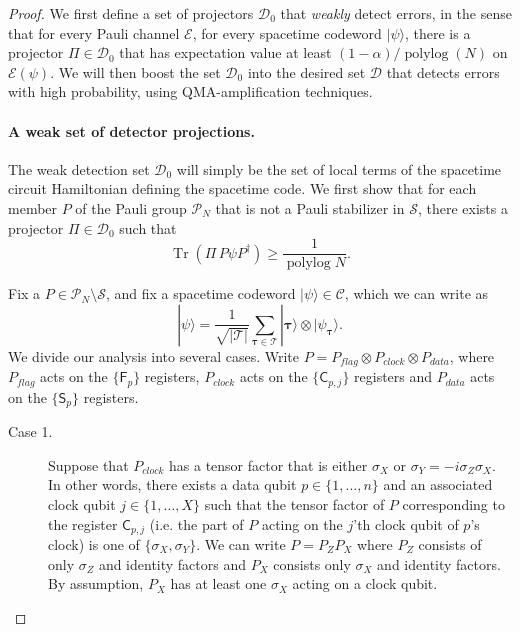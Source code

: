 \documentclass[11pt,letterpaper]{article}
\theoremstyle{definition}
\theoremstyle{remark}
\newcommand{\Paren}[1]{\left(#1\right)}
\DeclareMathOperator{\Tr}{Tr}
\DeclareMathOperator{\polylog}{polylog}
\newcommand{\cC}{\mathcal C}
\newcommand{\cD}{\mathcal D}
\newcommand{\cE}{\mathcal E}
\newcommand{\cP}{\mathcal P}
\newcommand{\cS}{\mathcal S}
\newcommand{\cT}{\mathcal T}
\renewcommand{\geq}{\geqslant}
\numberwithin{equation}{section}
\let\origparagraph\paragraph
\renewcommand{\paragraph}[1]{\origparagraph{#1.}}
\theoremstyle{definition}
\newcommand{\ket}[1]{|#1\rangle}
\newcommand{\sC}{{\mathsf{C}}}
\newcommand{\sF}{{\mathsf{F}}}
\newcommand{\sS}{{\mathsf{S}}}
\newcommand{\timeconfig}{{\bm{\tau}}}
\begin{document}
\begin{proof}

%

We first define a set of projectors $\cD_0$ that \emph{weakly} detect errors, in the sense that for every Pauli channel $\cE$, for every spacetime codeword $\ket{\psi}$, there is a projector $\Pi \in \cD_0$ that has expectation value at least $(1 - \alpha)/\polylog(N)$ on $\cE(\psi)$. We will then boost the set $\cD_0$ into the desired set $\cD$ that detects errors with high probability, using QMA-amplification techniques.

\paragraph{A weak set of detector projections} The weak detection set $\cD_0$ will simply be the set of local terms of the spacetime circuit Hamiltonian defining the spacetime code. We first show that for each member $P$ of the Pauli group $\cP_N$ that is not a Pauli stabilizer in $\cS$, there exists a projector $\Pi \in \cD_0$ such that
\begin{equation}
  \Tr \Paren{ \Pi \, P \psi P^\dagger } \geq \frac{1}{\polylog N}.
\end{equation}
%

Fix a $P \in \cP_N \setminus \cS$, and fix a spacetime codeword $\ket{\psi} \in \cC$, which we can write as
  \begin{equation}
    \ket{\psi} = \frac{1}{\sqrt{|\cT|}} \sum_{\timeconfig \in \cT} \ket{\timeconfig} \otimes \ket{\psi_\timeconfig}.
  \end{equation}
We divide our analysis into several cases. Write $P = P_{flag} \otimes P_{clock} \otimes P_{data}$, where $P_{flag}$ acts on the $\{ \sF_p \}$ registers, $P_{clock}$ acts on the $\{ \sC_{p,j} \}$ registers and $P_{data}$ acts on the $\{ \sS_p \}$ registers. 

\begin{description}

\item[Case 1.] Suppose that $P_{clock}$ has a tensor factor that is either $\sigma_X$ or $\sigma_Y = -i \sigma_Z \sigma_X$. In other words, there exists a data qubit $p \in \{1,\ldots,n\}$ and an associated clock qubit $j \in \{1,\ldots,X\}$ such that the tensor factor of $P$ corresponding to the register $\sC_{p,j}$ (i.e. the part of $P$ acting on the $j$'th clock qubit of $p$'s clock) is one of $\{\sigma_X,\sigma_Y\}$. We can write $P = P_Z P_X$ where $P_Z$ consists of only $\sigma_Z$ and identity factors and $P_X$ consists only $\sigma_X$ and identity factors. By assumption, $P_X$ has at least one $\sigma_X$ acting on a clock qubit.
  

\end{description}
\end{proof}
\end{document}
